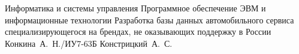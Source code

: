 \documentclass{bmstu}
\begin{document}
	\makecourseworktitle
	{Информатика и системы управления} 
	{Программное обеспечение ЭВМ и информационные технологии} 
	{Разработка базы данных автомобильного сервиса специализирующегося на брендах, не оказывающих поддержку в России} 
	{Конкина~А.~Н./ИУ7-63Б}
	{Констрицкий~А.~С.} 
	{}
	{}
	
	\setcounter{page}{3}
	
	\maketableofcontents
	
	
	
	
	
	
	
	
	
	
	
	\makebibliography	
\end{document}
